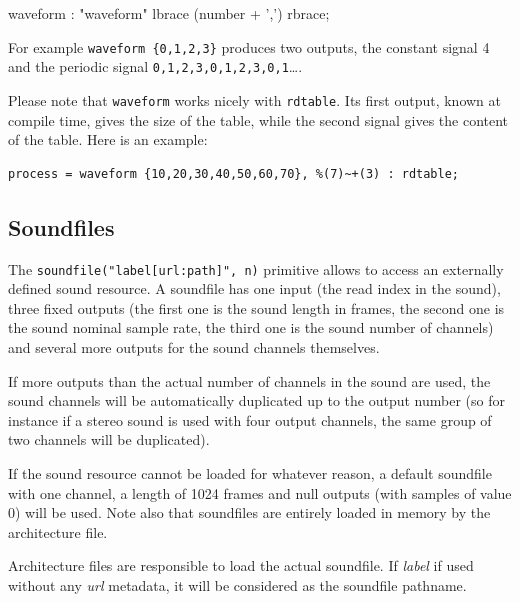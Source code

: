   \begin{rail}
  waveform : "waveform" lbrace (number + ',') rbrace;
  \end{rail}

For example \lstinline'waveform {0,1,2,3}' produces two outputs, the constant signal 4 and the periodic signal \lstinline'0,1,2,3,0,1,2,3,0,1'\ldots. 

Please note that \lstinline'waveform' works nicely with \lstinline'rdtable'. Its first output, known at compile time, gives the size of the table, while the second signal gives the content of the table. Here is an example:
\begin{lstlisting}
process = waveform {10,20,30,40,50,60,70}, %(7)~+(3) : rdtable;
\end{lstlisting}

\bigskip

\subsection{Soundfiles}

The  \lstinline'soundfile("label[url:path]", n)' primitive allows to access an externally defined sound resource. A soundfile has one input (the read index in the sound), three fixed outputs (the first one is the sound length in frames, the second one is the sound nominal sample rate, the third one is the sound number of channels) and several more outputs for the sound channels themselves. 

If more outputs than the actual number of channels in the sound are used, the sound channels will be automatically duplicated up to the output number (so for instance if a stereo sound is used with four output channels, the same group of two channels will be duplicated).

If the sound resource cannot be loaded for whatever reason, a default soundfile with one channel, a length of 1024 frames and null outputs (with samples of value 0) will be used. Note also that soundfiles are entirely loaded in memory by the architecture file.

Architecture files are responsible to load the actual soundfile. If {\it label} if used without any {\it url} metadata, it will be considered as the soundfile pathname. 

